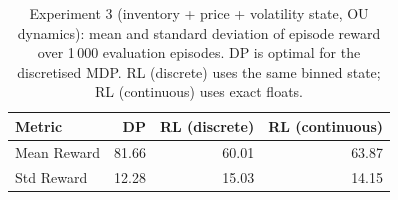 \begin{table}[h]
\centering
\begin{tabular}{lrrr}
\toprule
Metric & DP & RL (discrete) & RL (continuous) \\
\midrule
Mean Reward & 81.66 & 60.01 & 63.87 \\
Std Reward & 12.28 & 15.03 & 14.15 \\
\bottomrule
\end{tabular}
\caption{Experiment 3 (inventory + price + volatility state, OU dynamics): mean and standard deviation of episode reward over 1\,000 evaluation episodes. DP is optimal for the discretised MDP. RL (discrete) uses the same binned state; RL (continuous) uses exact floats.}
\label{tab:exp3}
\end{table}
